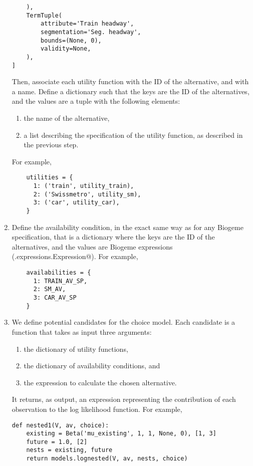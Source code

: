 \documentclass[12pt,a4paper]{article}
\begin{document}
\begin{enumerate}
\begin{lstlisting}
    ),
    TermTuple(
        attribute='Train headway',
        segmentation='Seg. headway',
        bounds=(None, 0),
        validity=None,
    ),
]
  \end{lstlisting}
Then, associate each utility function with the ID of the alternative,
  and with a name. Define a dictionary such that the keys are the ID
  of the alternatives, and the values are a tuple with the following
  elements:
  \begin{enumerate}
  \item the name of the alternative,
  \item a list describing the specification of the utility function,
    as described in the previous step.
  \end{enumerate}
  For example,
  \begin{lstlisting}
    utilities = {
      1: ('train', utility_train),
      2: ('Swissmetro', utility_sm),
      3: ('car', utility_car),
    }
  \end{lstlisting}
\item \label{item:avail}Define the availability condition, in the exact same way as
  for any Biogeme specification, that is a dictionary where the keys
  are the ID of the alternatives, and the values are Biogeme
  expressions (\lstinline@biogeme.expressions.Expression@). For
  example,
  \begin{lstlisting}
    availabilities = {
      1: TRAIN_AV_SP,
      2: SM_AV,
      3: CAR_AV_SP
    }
  \end{lstlisting}
\item \label{item:models}We define potential candidates for the choice model. Each
  candidate is a function that takes as input three arguments:
  \begin{enumerate}
  \item the dictionary of utility functions,
  \item the dictionary of availability conditions, and
  \item the expression to calculate the chosen alternative. 
  \end{enumerate}
  It returns, as output, an expression representing the
  contribution of each observation to the log likelihood function.
  For example,
  \begin{lstlisting}
def nested1(V, av, choice):
    existing = Beta('mu_existing', 1, 1, None, 0), [1, 3]
    future = 1.0, [2]
    nests = existing, future
    return models.lognested(V, av, nests, choice)
  \end{lstlisting}


\end{enumerate}
\end{document}
